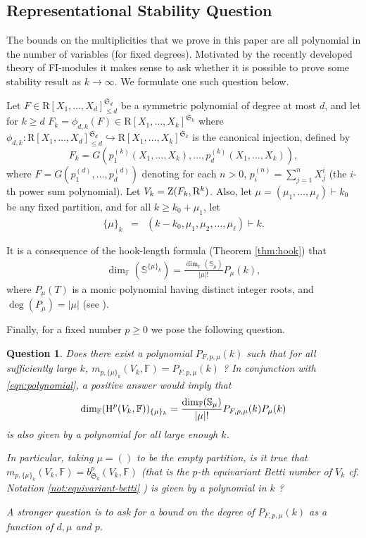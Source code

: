 \documentclass{amsart}
\newtheorem{question}{Question}
\theoremstyle{definition}
\theoremstyle{remark}
\numberwithin{equation}{section}
\begin{document}
\subsection{Representational Stability Question}
The bounds on the multiplicities that we prove in this paper are all polynomial in the number of variables
(for fixed  degrees).  Motivated by the recently developed theory of FI-modules \cite{Church-et-al} it makes sense  to ask whether it is possible to prove some stability result as $k \rightarrow \infty$.
We formulate one such question below.

Let $F \in {\mathrm{R}}[X_1,\ldots,X_d]^{\mathfrak{S}_d}_{\leq d}$ be a symmetric polynomial of degree at most $d$, 
and let for $k \geq d$ 
$F_k = \phi_{d,k}(F) \in {\mathrm{R}}[X_1,\ldots,X_k]^{\mathfrak{S}_k}$ where $\phi_{d,k}: {\mathrm{R}}[X_1,\ldots,X_d]^{\mathfrak{S}_d}_{\leq d} \hookrightarrow {\mathrm{R}}[X_1,\ldots,X_k]^{\mathfrak{S}_k}$ is the canonical
injection, defined by 
\[
F_k = G(p_1^{(k)}(X_1,\ldots,X_k) ,\ldots,p_d^{(k)}(X_1,\ldots,X_k)),
\]
where $F = G(p_1^{(d)},\ldots, p_d^{(d)})$ denoting
for each $n>0$, $p_i^{(n)} = \sum_{j=1}^n X_j^i$ (the $i$-th power sum polynomial). 
Let $V_k = {{\rm Z}}(F_k,{\mathrm{R}}^k)$.
Also, let $\mu = (\mu_1,\ldots,\mu_\ell) \vdash k_0$ be any fixed partition, and for all $k \geq k_0 + \mu_1$, let
\begin{eqnarray}
\label{eqn:def-of-mu-k}
\{\mu\}_k &=& (k-k_0, \mu_1,\mu_2,\ldots,\mu_\ell) \vdash k.
\end{eqnarray} 

It is a consequence of the hook-length formula (Theorem \ref{thm:hook}) that 
\begin{eqnarray}
\label{eqn:polynomial}
\dim_{\mathbb{F}}(\mathbb{S}^{\{\mu\}_k})=  \frac{\dim_{\mathbb{F}}(\mathbb{S}_\mu)}{|\mu|!} P_\mu(k),
\end{eqnarray}
where $P_\mu(T)$ is a  monic polynomial having distinct integer roots,  and $\deg(P_\mu) = |\mu|$ (see \cite[7.2.2]{Deligne2004}).

Finally, for a fixed number $p \geq 0$ we pose the following question.

\begin{question}
\label{question:stability}
Does there exist a polynomial $P_{F,p,\mu}(k)$ such that
for all sufficiently large $k$, 
$m_{p,\{\mu\}_k}(V_k,{\mathbb{F}}) = P_{F,p,\mu}(k)$ ? 
In conjunction with
\eqref{eqn:polynomial}, a positive answer would imply that
\[
\dim_{\mathbb{F}}({\mbox{\rm H}}^p(V_k,{\mathbb{F}}))_{\{\mu\}_k} =   \frac{\dim_{\mathbb{F}}(\mathbb{S}_\mu)}{|\mu|!} P_{F,p,\mu}(k) P_\mu(k)
\]
is also given by a polynomial for all large enough $k$.

In particular, taking $\mu=()$ to be the empty partition, is it true that
$m_{p,\{\mu\}_k}(V_k,{\mathbb{F}}) = b^p_{\mathfrak{S}_k}(V_k,{\mathbb{F}})$ (that is the $p$-th equivariant Betti number of $V_k$ cf. Notation \ref{not:equivariant-betti} ) is given by a polynomial in $k$ ?

A stronger question is to ask for a bound on the degree of $P_{F,p,\mu}(k)$ as a function of $d,\mu$ and $p$. 
\end{question}
\end{document}
